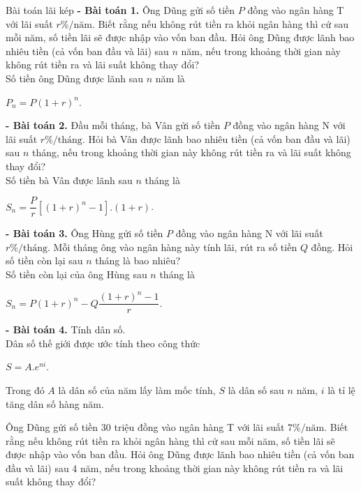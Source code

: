 \begin{dang}{Bài toán lãi kép}
	\textbf{- Bài toán 1.} Ông Dũng gửi số tiền $P$ đồng vào ngân hàng T với lãi suất $r\% / \mbox{năm}$. Biết rằng nếu không rút tiền ra khỏi ngân hàng thì cứ sau mỗi năm, số tiền lãi sẽ được nhập vào vốn ban đầu. Hỏi ông Dũng được lãnh bao nhiêu tiền (cả vốn ban đầu và lãi) sau $n$ năm, nếu trong khoảng thời gian này không rút tiền ra và lãi suất không thay đổi?\\
	Số tiền ông Dũng được lãnh sau $n$ năm là 
	\begin{center}
		$P_n=P(1+r)^n$. 
	\end{center}
	\textbf{- Bài toán 2.} Đầu mỗi tháng, bà Vân gửi số tiền $P$ đồng vào ngân hàng N với lãi suất $r\% / \mbox{tháng}$. Hỏi bà Vân được lãnh bao nhiêu tiền (cả vốn ban đầu và lãi) sau $n$ tháng, nếu trong khoảng thời gian này không rút tiền ra và lãi suất không thay đổi?\\ 
	Số tiền bà Vân được lãnh sau $n$ tháng là 
	\begin{center}
		$S_n=\dfrac{P}{r}\left[ (1+r)^n-1\right].(1+r)$. 
	\end{center}
	\textbf{- Bài toán 3.} Ông Hùng gửi số tiền $P$ đồng vào ngân hàng N với lãi suất $r\% / \mbox{tháng}$. Mỗi tháng ông vào ngân hàng này tính lãi, rút ra số tiền $Q$ đồng. Hỏi số tiền còn lại sau $n$ tháng là bao nhiêu?\\
	Số tiền còn lại của ông Hùng sau $n$ tháng là
	\begin{center}
		$S_n=P(1+r)^n-Q\dfrac{(1+r)^n-1}{r}$. 
	\end{center}
	\textbf{- Bài toán 4.} Tính dân số.\\
	Dân số thế giới được ước tính theo công thức\\
	\begin{center}
		$S=A.e^{ni}$.
	\end{center}
	Trong đó $A$ là dân số của năm lấy làm mốc tính, $S$ là dân số sau $n$ năm, $i$ là tỉ lệ tăng dân số hàng năm.
\end{dang}
%
\begin{vd}%
	Ông Dũng gửi số tiền 30 triệu đồng vào ngân hàng T với lãi suất $7\% / \mbox{năm}$. Biết rằng nếu không rút tiền ra khỏi ngân hàng thì cứ sau mỗi năm, số tiền lãi sẽ được nhập vào vốn ban đầu. Hỏi ông Dũng được lãnh bao nhiêu tiền (cả vốn ban đầu và lãi) sau 4 năm, nếu trong khoảng thời gian này không rút tiền ra và lãi suất không thay đổi?
\end{vd}
